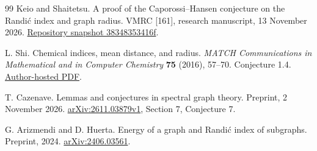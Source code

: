 \documentclass[11pt,a4paper]{article}
\begin{document}
\begin{thebibliography}{99}
Keio and Shaitetsu.
A proof of the Caporossi--Hansen conjecture on the Randi\'c index
and graph radius. VMRC [161], research manuscript, 13 November 2026.
\href{https://github.com/QEEDDD/Verifiable-Mathematical-Reasoning-Corpus/tree/38348353416f1f7fc50cecb93c3b554a00260c13}{Repository snapshot 38348353416f}.

L. Shi. Chemical indices, mean distance, and radius.
\emph{MATCH Communications in Mathematical and in Computer Chemistry}
\textbf{75} (2016), 57--70. Conjecture 1.4.
\href{https://archive.ymsc.tsinghua.edu.cn/pacm_download/138/4638-match75n1_57-70ChemicalIndex.pdf}{Author-hosted PDF}.

T. Cazenave. Lemmas and conjectures in spectral graph theory.
Preprint, 2 November 2026.
\href{https://arxiv.org/abs/2611.03879v1}{arXiv:2611.03879v1}, Section 7, Conjecture 7.

G. Arizmendi and D. Huerta.
Energy of a graph and Randi\'c index of subgraphs.
Preprint, 2024. \href{https://arxiv.org/abs/2406.03561}{arXiv:2406.03561}.

\end{thebibliography}
\end{document}
